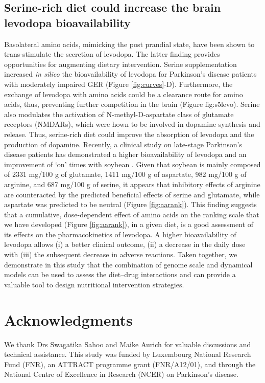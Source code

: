 \subsection{Serine-rich diet could increase the brain levodopa bioavailability}
Basolateral amino acids, mimicking the post prandial state, have been shown to trans-stimulate the secretion of levodopa\cite{camargo2014molecular}. The latter finding provides opportunities for augmenting dietary intervention. Serine supplementation increased \textit{in silico} the bioavailability of levodopa for Parkinson's disease patients with moderately impaired GER (Figure \ref{fig:curves}-D). Furthermore, the exchange of levodopa with amino acids could be a clearance route for amino acids, thus, preventing further competition in the brain (Figure {fig:s5levo}). Serine also modulates the activation of N-methyl-D-aspartate
class of glutamate receptors (NMDARs), which were hown to be involved in dopamine synthesis and release\cite{gelfin2012d}. Thus, serine-rich diet could improve the absorption of levodopa and the production of dopamine\cite{growdon1982effects}. Recently, a clinical study on late-stage Parkinson's disease patients has demonstrated a higher bioavailability of levodopa and an improvement of ‘on’ times with soybean \cite{nagashima2016effects}. Given that soybean is mainly composed of 2331 mg/100 g of glutamate, 1411 mg/100 g of aspartate, 982 mg/100 g of arginine, and 687 mg/100 g of serine, it appears that inhibitory effects of arginine are counteracted by the predicted beneficial effects of serine and glutamate, while aspartate was predicted to be neutral (Figure \ref{fig:aarank}). This finding suggests that a cumulative, dose-dependent effect of amino acids on the ranking scale that we have developed (Figure \ref{fig:aarank}), in a given diet, is a good assessment of its effects on the pharmacokinetics of levodopa. 
A higher bioavailability of levodopa allows (i) a better clinical outcome, (ii) a decrease in the daily dose with (iii) the subsequent decrease in adverse reactions.
Taken together, we demonstrate in this study that the combination of genome scale and dynamical models can be used to assess the diet–drug interactions and can provide a valuable tool to design nutritional intervention strategies.
\section*{Acknowledgments}
We thank Drs Swagatika Sahoo and Maike Aurich for valuable discussions and
technical assistance. This study was funded by Luxembourg National Research Fund
(FNR), an ATTRACT programme grant (FNR/A12/01), and through the National Centre
of Excellence in Research (NCER) on Parkinson's disease.
